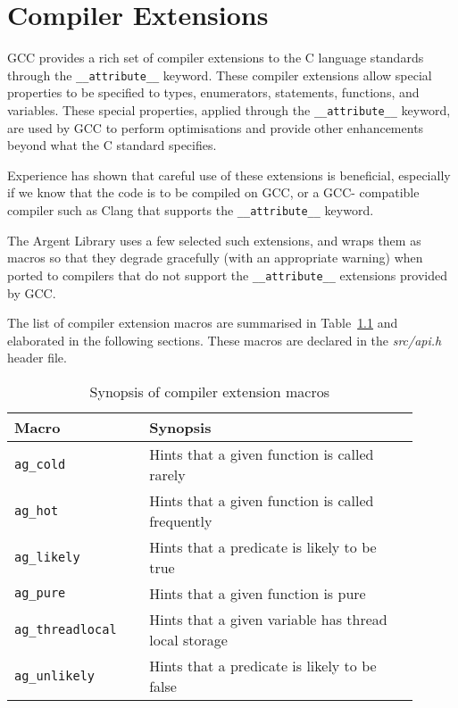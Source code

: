 \lstset{basicstyle=\footnotesize,style=CODE}


\chapter{Compiler Extensions}

GCC provides a rich set of compiler extensions to the C language standards
through the \texttt{\_\_attribute\_\_} keyword. These compiler extensions allow 
special properties to be specified to types, enumerators, statements, functions, 
and variables. These special properties, applied through the 
\texttt{\_\_attribute\_\_} keyword, are used by GCC to perform optimisations and
provide other enhancements beyond what the C standard specifies.

Experience has shown that careful use of these extensions is beneficial,
especially if we know that the code is to be compiled on GCC, or a GCC-
compatible compiler such as Clang that supports the 
\texttt{\_\_attribute\_\_} keyword.

The Argent Library uses a few selected such extensions, and wraps them as macros
so that they degrade gracefully (with an appropriate warning) when ported to 
compilers that do not support the \texttt{\_\_attribute\_\_} extensions provided
by GCC.

The list of compiler extension macros are summarised in Table~\ref{tab:synopsis}
and elaborated in the following sections. These macros are declared in the
\emph{src/api.h} header file.

\renewcommand\arraystretch{1.1}
\begin{table}[!htbp]
\centering
\small
\begin{tabular}[t]{>{\centering}m{0.3\linewidth}
    >{\raggedright\arraybackslash}m{0.6\linewidth}}
\toprule
\textbf{Macro} & \textbf{Synopsis} \\
\midrule
\texttt{ag\_cold} & Hints that a given function is called rarely \\
\texttt{ag\_hot} & Hints that a given function is called frequently \\
\texttt{ag\_likely} & Hints that a predicate is likely to be true \\
\texttt{ag\_pure} & Hints that a given function is pure \\
\texttt{ag\_threadlocal} & Hints that a given variable has thread local 
    storage \\
\texttt{ag\_unlikely} & Hints that a predicate is likely to be false \\
\bottomrule
\end{tabular}
\caption{Synopsis of compiler extension macros}
\label{tab:synopsis}
\end{table}


